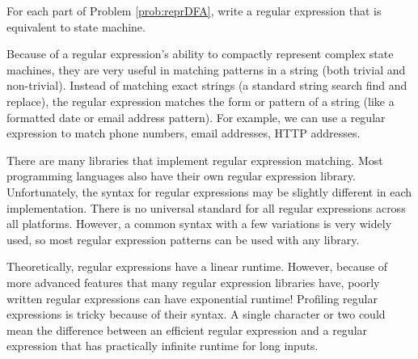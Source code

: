 \begin{problem}
For each part of Problem \ref{prob:reprDFA}, write a  regular expression that is equivalent to state machine.
\label{prob:equiv_regex}
\end{problem}

Because of a regular expression's ability to compactly represent complex state machines, 
they are very useful in matching patterns in a string (both trivial and non-trivial).
Instead of matching exact strings (a standard string search find and replace), the regular expression matches the form or pattern of a string (like a formatted date or email address pattern).
For example, we can use a regular expression to match phone numbers, email addresses, HTTP addresses.

There are many libraries that implement regular expression matching.
Most programming languages also have their own regular expression library.
Unfortunately, the syntax for regular expressions may be slightly different in each implementation. 
There is no universal standard for all regular expressions across all platforms. 
However, a common syntax with a few variations is very widely used, so most regular expression patterns can be used with any library.

\begin{warn}
Theoretically, regular expressions have a linear runtime.  However, because of more advanced features that many regular expression libraries have, poorly written regular expressions can have exponential runtime!  Profiling regular expressions is tricky because of their syntax.  A single character or two  could mean the difference between an efficient regular expression and a regular expression that has practically infinite runtime for long inputs.
\end{warn}

